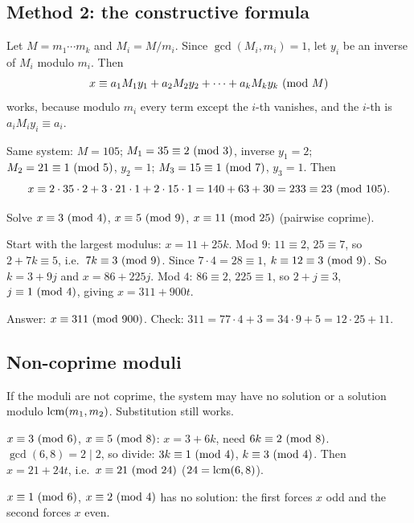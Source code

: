 \subsection{Method 2: the constructive formula}

Let $M = m_1\cdots m_k$ and $M_i = M/m_i$. Since $\gcd(M_i, m_i) = 1$, let $y_i$ be an inverse
of $M_i$ modulo $m_i$. Then
\[ x \equiv a_1M_1y_1 + a_2M_2y_2 + \cdots + a_kM_ky_k \ (\mathrm{mod}\ M) \]
works, because modulo $m_i$ every term except the $i$-th vanishes, and the $i$-th is
$a_i M_iy_i \equiv a_i$.

\begin{example}
Same system: $M = 105$; $M_1 = 35 \equiv 2 \ (\mathrm{mod}\ 3)$, inverse $y_1 = 2$; $M_2 = 21 \equiv 1
\ (\mathrm{mod}\ 5)$, $y_2 = 1$; $M_3 = 15 \equiv 1 \ (\mathrm{mod}\ 7)$, $y_3 = 1$. Then
\[ x \equiv 2\cdot 35\cdot 2 + 3\cdot 21\cdot 1 + 2\cdot 15\cdot 1 = 140 + 63 + 30 = 233
\equiv 23 \ (\mathrm{mod}\ 105). \]
\end{example}

\begin{example}
Solve $x \equiv 3 \ (\mathrm{mod}\ 4)$, $x \equiv 5 \ (\mathrm{mod}\ 9)$, $x\equiv 11 \ (\mathrm{mod}\ 25)$ (pairwise coprime).

Start with the largest modulus: $x = 11 + 25k$. Mod $9$: $11 \equiv 2$, $25 \equiv 7$, so
$2 + 7k \equiv 5$, i.e.\ $7k \equiv 3 \ (\mathrm{mod}\ 9)$. Since $7\cdot 4 = 28 \equiv 1$, $k \equiv 12 \equiv 3
\ (\mathrm{mod}\ 9)$. So $k = 3 + 9j$ and $x = 86 + 225j$. Mod $4$: $86 \equiv 2$, $225\equiv 1$, so
$2 + j \equiv 3$, $j \equiv 1 \ (\mathrm{mod}\ 4)$, giving $x = 311 + 900t$.

Answer: $x \equiv 311 \ (\mathrm{mod}\ 900)$. Check: $311 = 77\cdot 4 + 3 = 34\cdot 9 + 5 = 12\cdot 25 + 11$.
\end{example}

\subsection{Non-coprime moduli}

If the moduli are not coprime, the system may have no solution or a solution modulo
$\operatorname{lcm}(m_1,m_2)$. Substitution still works.

\begin{example}
$x \equiv 3 \ (\mathrm{mod}\ 6)$, $x\equiv 5 \ (\mathrm{mod}\ 8)$: $x = 3 + 6k$, need $6k \equiv 2 \ (\mathrm{mod}\ 8)$. $\gcd(6,8) = 2
\mid 2$, so divide: $3k \equiv 1 \ (\mathrm{mod}\ 4)$, $k \equiv 3 \ (\mathrm{mod}\ 4)$. Then $x = 21 + 24t$, i.e.\
$x\equiv 21 \ (\mathrm{mod}\ 24)$ ($24 = \operatorname{lcm}(6,8)$).

$x\equiv 1 \ (\mathrm{mod}\ 6)$, $x \equiv 2 \ (\mathrm{mod}\ 4)$ has no solution: the first forces $x$ odd and the second
forces $x$ even.
\end{example}

